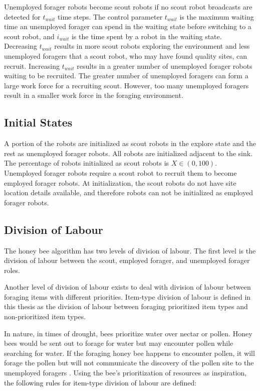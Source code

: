Unemployed forager robots become scout robots if no scout robot broadcasts are detected for $t_{wait}$ time steps. The control parameter $t_{wait}$ is the maximum waiting time an unemployed forager can spend in the waiting state before switching to a scout robot, and $i_{wait}$ is the time spent by a robot in the waiting state. Decreasing $t_{wait}$ results in more scout robots exploring the environment and less unemployed foragers that a scout robot, who may have found quality sites, can recruit. Increasing $t_{wait}$ results in a greater number of unemployed forager robots waiting to be recruited. The greater number of unemployed foragers can form a large work force for a recruiting scout. However, too many unemployed foragers result in a smaller work force in the foraging environment.

\subsection{Initial States}
\label{initialstates}

A portion of the robots are initialized as scout robots in the explore state and the rest as unemployed forager robots. All robots are initialized adjacent to the sink. The percentage of robots initialized as scout robots is $X\in(0,100)$. Unemployed forager robots require a scout robot to recruit them to become employed forager robots. At initialization, the scout robots do not have site location details available, and therefore robots can not be initialized as employed forager robots. 

\subsection{Division of Labour}
\label{natureinspired:divisionoflabour}
The honey bee algorithm has two levels of division of labour. The first level is the division of labour between the scout, employed forager, and unemployed forager roles.

Another level of division of labour exists to deal with division of labour between foraging items with different priorities. Item-type division of labour is defined in this thesis as the division of labour between foraging prioritized item types and non-prioritized item types.

In nature, in times of drought, bees prioritize water over nectar or pollen. Honey bees would be sent out to forage for water but may encounter pollen while searching for water. If the foraging honey bee happens to encounter pollen, it will forage the pollen but will not communicate the discovery of the pollen site to the unemployed foragers \cite{seeley2009wisdom}. Using the bee's prioritization of resources as inspiration, the following rules for item-type division of labour are defined:

